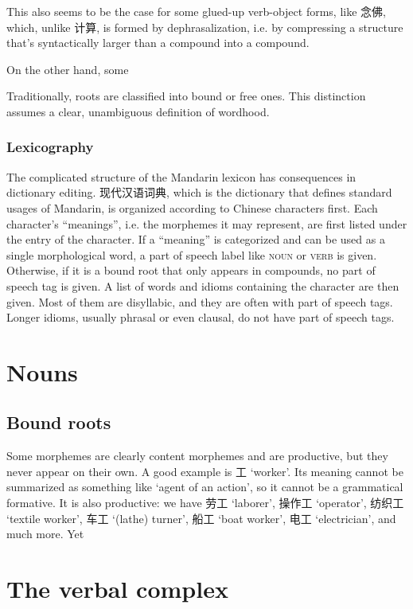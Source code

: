 \documentclass[UTF8, a4paper, oneside, scheme=plain, 12pt]{ctexrep}
\newcommand{\translate}[1]{`#1'}
\newcommand*{\category}[1]{\textsc{#1}}
\begin{document}
This also seems to be the case for some glued-up verb-object forms,
like 念佛, which, unlike 计算, is formed by dephrasalization,
i.e. by compressing a structure that's syntactically larger than a compound into a compound.

On the other hand, some 

Traditionally, roots are classified into bound or free ones.
This distinction assumes a clear, unambiguous definition of wordhood.

\subsection{Lexicography}

The complicated structure of the Mandarin lexicon has consequences in dictionary editing.
现代汉语词典, which is the dictionary that defines standard usages of Mandarin,
is organized according to Chinese characters first.
Each character's ``meanings'',
i.e. the morphemes it may represent,
are first listed under the entry of the character.
If a ``meaning'' is categorized and can be used as a single morphological word,
a part of speech label like \category{noun} or \category{verb} is given.
Otherwise, if it is a bound root that only appears in compounds,
no part of speech tag is given.
A list of words and idioms containing the character are then given.
Most of them are disyllabic, and they are often with part of speech tags.
Longer idioms, usually phrasal or even clausal,
do not have part of speech tags.

\chapter{Nouns}

\section{Bound roots}

Some morphemes are clearly content morphemes and are productive,
but they never appear on their own.
A good example is 工 \translate{worker}.
Its meaning cannot be summarized as something like \translate{agent of an action},
so it cannot be a grammatical formative.
It is also productive:
we have 劳工 \translate{laborer}, 操作工 \translate{operator}, 纺织工 \translate{textile worker}, 车工 \translate{(lathe) turner}, 船工 \translate{boat worker}, 电工 \translate{electrician}, and much more.
Yet 

\chapter{The verbal complex}\label{chap:verbal-complex}
\end{document}
